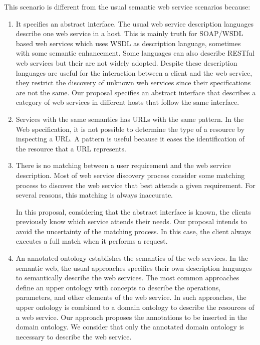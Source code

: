 \documentclass{singlecol-new}
\theoremstyle{TH}{
\newtheorem{lemma}{Lemma}
\newtheorem{theorem}[lemma]{Theorem}
\newtheorem{corrolary}[lemma]{Corrolary}
\newtheorem{conjecture}[lemma]{Conjecture}
\newtheorem{proposition}[lemma]{Proposition}
\newtheorem{claim}[lemma]{Claim}
\newtheorem{stheorem}[lemma]{Wrong Theorem}
\newtheorem{algorithm}{Algorithm}
}
\theoremstyle{THrm}{
\newtheorem{definition}{Definition}[section]
\newtheorem{question}{Question}[section]
\newtheorem{remark}{Remark}
\newtheorem{scheme}{Scheme}
}
\theoremstyle{THhit}{
\newtheorem{case}{Case}[section]
}
\begin{document}
This scenario is different from the usual semantic web service scenarios because:
\begin{enumerate}
	\item It specifies an abstract interface. The usual web service description languages describe one web service in a host. This is mainly truth for SOAP/WSDL based web services which uses WSDL as description language, sometimes with some semantic enhancement. Some languages can also describe RESTful web services but their are not widely adopted.  
	Despite these description languages are useful for the interaction between a client and the web service, they restrict the discovery of unknown web services since their specifications are not the same.
	Our proposal specifies an abstract interface that describes a category of web services in different hosts that follow the same interface.
	\item Services with the same semantics has URLs with the same pattern. In the Web specification, it is not possible to determine the type of a resource by inspecting a URL. A pattern is useful because it eases the identification of the resource that a URL represents.  
	\item There is no matching between a user requirement and the web service description. Most of web service discovery process consider some matching process to discover the web service that best attends a given requirement. For several reasons, this matching is always inaccurate.
	
	In this proposal, considering that the abstract interface is known, the clients previously know which service attends their needs. Our proposal intends to avoid the uncertainty of the matching process. In this case, the client always executes a full match when it performs a request. 
	\item An annotated ontology establishes the semantics of the web services. In the semantic web, the usual approaches specifies their own description languages to semantically describe the web services. The most common approaches define an upper ontology with concepts to describe the operations, parameters, and other elements of the web service. In such approaches, the upper ontology is combined to a domain ontology to describe the resources of a web service.
	Our approach proposes the annotations to be inserted in the domain ontology. We consider that only the annotated domain ontology is necessary to describe the web service. 
\end{enumerate}
\end{document}
